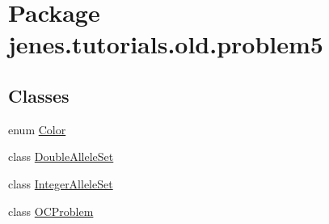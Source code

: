 \hypertarget{namespacejenes_1_1tutorials_1_1old_1_1problem5}{\section{Package jenes.\-tutorials.\-old.\-problem5}
\label{namespacejenes_1_1tutorials_1_1old_1_1problem5}
}
\subsection*{Classes}
\begin{DoxyCompactItemize}
\item 
enum \hyperlink{enumjenes_1_1tutorials_1_1old_1_1problem5_1_1_color}{Color}
\item 
class \hyperlink{classjenes_1_1tutorials_1_1old_1_1problem5_1_1_double_allele_set}{Double\-Allele\-Set}
\item 
class \hyperlink{classjenes_1_1tutorials_1_1old_1_1problem5_1_1_integer_allele_set}{Integer\-Allele\-Set}
\item 
class \hyperlink{classjenes_1_1tutorials_1_1old_1_1problem5_1_1_o_c_problem}{O\-C\-Problem}
\end{DoxyCompactItemize}
